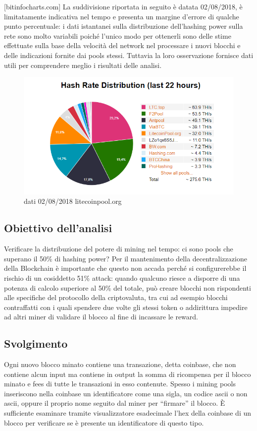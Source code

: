 [bitinfocharts.com]
La suddivisione riportata in seguito è datata 02/08/2018, è limitatamente indicativa nel tempo e presenta un margine d’errore di qualche punto percentuale: i dati istantanei sulla distribuzione dell’hashing power sulla rete sono molto variabili poiché l’unico modo per ottenerli sono delle stime effettuate sulla base della velocità del network nel processare i nuovi blocchi e delle indicazioni fornite dai pools stessi. Tuttavia la loro osservazione fornisce dati utili per comprendere meglio i risultati delle analisi.


\begin{figure}[h!]
	\centering
	\includegraphics[width=1.0\linewidth]{images/HashingPower020818}
	\caption{dati 02/08/2018 litecoinpool.org}
	\label{fig:hashingpower020818}
\end{figure}


\subsection{Obiettivo dell’analisi}
Verificare la distribuzione del potere di mining nel tempo: ci sono pools che superano il 50\% di hashing power? Per il mantenimento della decentralizzazione della Blockchain è importante che questo non accada perché si configurerebbe il rischio di un cosiddetto 51\% attack: quando qualcuno riesce a disporre di una potenza di calcolo superiore al 50\% del totale, può creare blocchi non rispondenti alle specifiche del protocollo della criptovaluta, tra cui ad esempio blocchi contraffatti con i quali spendere due volte gli stessi token o addirittura impedire ad altri miner di validare il blocco al fine di incassare le reward.


\subsection{Svolgimento}
Ogni nuovo blocco minato contiene una transazione, detta coinbase, che non contiene alcun input ma contiene in output la somma di ricompensa per il blocco minato e fees di tutte le transazioni in esso contenute.
Spesso i mining pools inseriscono nella coinbase un identificatore come una sigla, un codice ascii o non ascii, oppure il proprio nome seguito dal miner per “firmare” il blocco. È sufficiente esaminare tramite visualizzatore esadecimale l’hex della coinbase di un blocco per verificare se è presente un identificatore di questo tipo.

